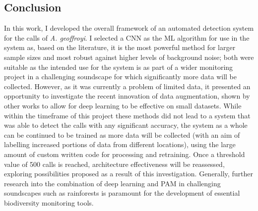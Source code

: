 \documentclass[11pt]{article}
\begin{document}
\subsection{Conclusion}
	
In this work, I developed the overall framework of an automated detection system for the calls of \textit{A. geoffroyi}. I selected a CNN as the ML algorithm for use in the system as, based on the literature, it is the most powerful method for larger sample sizes and most robust against higher levels of background noise; both were suitable as the intended use for the system is as part of a wider monitoring project in a challenging soundscape for which significantly more data will be collected. However, as it was currently a problem of limited data, it presented an opportunity to investigate the recent innovation of data augmentation, shown by other works to allow for deep learning to be effective on small datasets. While within the timeframe of this project these methods did not lead to a system that was able to detect the calls with any significant accuracy, the system as a whole can be continued to be trained as more data will be collected (with an aim of labelling increased portions of data from different locations), using the large amount of custom written code for processing and retraining. Once a threshold value of 500 calls is reached, architecture effectiveness will be reassessed, exploring possibilities proposed as a result of this investigation. Generally, further research into the combination of deep learning and PAM in challenging soundscapes such as rainforests is paramount for the development of essential biodiversity monitoring tools. 




\end{document}
